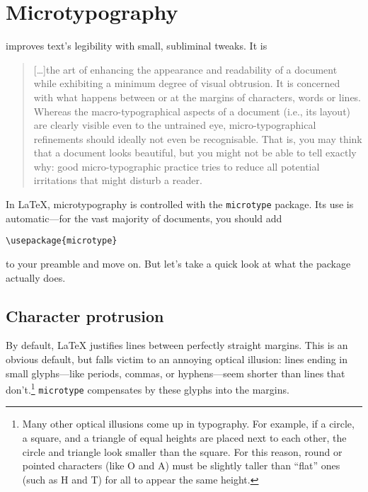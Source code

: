 \chapter{Microtypography}
\label{microtype}

 improves text's legibility with small,
subliminal tweaks. It is
\begin{quote}
\small
[\dots]the art of enhancing the appearance and readability of a
document while exhibiting a minimum degree of visual obtrusion.
It is concerned with what happens between or at the margins of characters,
words or lines. Whereas the macro-typographical aspects of a document
(i.e., its layout) are clearly visible even to the untrained eye,
micro-typographical refinements should ideally not even be recognisable.
That is, you may think that a document looks beautiful, but you
might not be able to tell exactly why: good micro-typographic practice tries to
reduce all potential irritations that might disturb a reader.\punckern{}
\end{quote}

In \LaTeX{}, microtypography is controlled with the
\texttt{microtype} package.
Its use is automatic---for the vast majority of documents, you should add
\begin{leftfigure}
\begin{lstlisting}
\usepackage{microtype}
\end{lstlisting}
\end{leftfigure}
to your preamble and move on.
But let's take a quick look at what the package actually does.

\section{Character protrusion}

By default, \LaTeX{} justifies lines between perfectly straight margins.
This is an obvious default,
but falls victim to an annoying optical illusion:
lines ending in small glyphs---like periods, commas,
or hyphens---seem shorter than lines that
don't.\punckern\footnote{Many other optical illusions come up in typography.
For example, if a circle, a square, and a triangle
of equal heights are placed next to each other,
the circle and triangle look smaller than the square.
For this reason, round or pointed characters (like O and A) must
be slightly taller than ``flat'' ones (such as H and T) for all
to appear the same height.\punckern{}}
\texttt{microtype} compensates by  these glyphs
into the margins.

